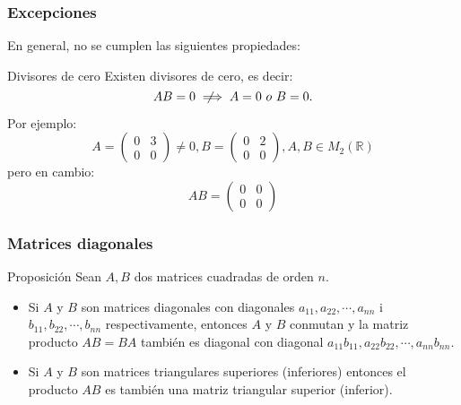 \documentclass[12pt]{article}
\newcommand{\notimplies}{%
  \mathrel{{\ooalign{\hidewidth$\not\phantom{=}$\hidewidth\cr$\implies$}}}}
\begin{document}
 
         \begin{frame}
  \frametitle{Excepciones}
  En general, \alert<1>{no se cumplen} las siguientes propiedades:
  
   \begin{block}{Divisores de cero}
Existen divisores de cero, es decir:
\[AB=0 \notimplies A = 0 \ o \ B = 0.\]
\end{block}
Por ejemplo:
\[A = \left(\begin{array}{cc}0 & 3\\0 & 0\end{array}\right)\neq 0, B = \left(\begin{array}{cc}0 & 2 \\0 & 0\end{array}\right), A,B  \in M_2(\mathbb{R}) \]
pero en cambio:
\[AB = \left(\begin{array}{cc}0 & 0\\0 & 0\end{array}\right) \]

 \end{frame} 
 
          \begin{frame}
  \frametitle{Matrices diagonales}
  
   \begin{block}{Proposici\'on}
Sean $A,B$ dos matrices cuadradas de orden $n$.
\begin{itemize}
\item Si $A$ y $B$ son matrices diagonales con diagonales $a_{11},a_{22},\cdots,a_{nn}$ i $b_{11},b_{22},\cdots,b_{nn}$ respectivamente, entonces $A$ y $B$ conmutan y la matriz producto $AB = BA$ tambi\'en es diagonal con diagonal $a_{11}b_{11}, a_{22}b_{22},\cdots, a_{nn}b_{nn}$.
\item Si $A$ y $B$ son matrices triangulares superiores (inferiores) entonces el producto $AB$ es tambi\'en una matriz triangular superior (inferior).
\end{itemize}
\end{block}
 \end{frame} 
 
\end{document}
